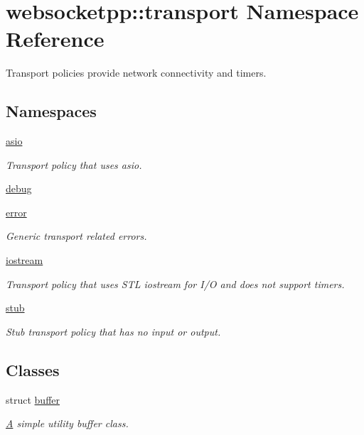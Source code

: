 \hypertarget{namespacewebsocketpp_1_1transport}{}\section{websocketpp\+:\+:transport Namespace Reference}
\label{namespacewebsocketpp_1_1transport}


Transport policies provide network connectivity and timers.  


\subsection*{Namespaces}
\begin{DoxyCompactItemize}
\item 
 \mbox{\hyperlink{namespacewebsocketpp_1_1transport_1_1asio}{asio}}
\begin{DoxyCompactList}\small\item\em Transport policy that uses asio. \end{DoxyCompactList}\item 
 \mbox{\hyperlink{namespacewebsocketpp_1_1transport_1_1debug}{debug}}
\item 
 \mbox{\hyperlink{namespacewebsocketpp_1_1transport_1_1error}{error}}
\begin{DoxyCompactList}\small\item\em Generic transport related errors. \end{DoxyCompactList}\item 
 \mbox{\hyperlink{namespacewebsocketpp_1_1transport_1_1iostream}{iostream}}
\begin{DoxyCompactList}\small\item\em Transport policy that uses S\+TL iostream for I/O and does not support timers. \end{DoxyCompactList}\item 
 \mbox{\hyperlink{namespacewebsocketpp_1_1transport_1_1stub}{stub}}
\begin{DoxyCompactList}\small\item\em Stub transport policy that has no input or output. \end{DoxyCompactList}\end{DoxyCompactItemize}
\subsection*{Classes}
\begin{DoxyCompactItemize}
\item 
struct \mbox{\hyperlink{structwebsocketpp_1_1transport_1_1buffer}{buffer}}
\begin{DoxyCompactList}\small\item\em \mbox{\hyperlink{struct_a}{A}} simple utility buffer class. \end{DoxyCompactList}\end{DoxyCompactItemize}
